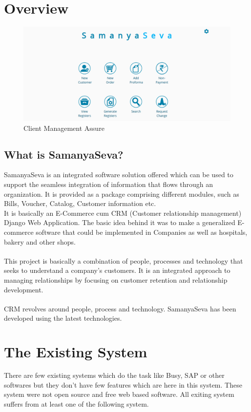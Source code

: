 \section{Overview}
\begin{figure}[!ht]
\centering
\includegraphics[scale=0.41]{input/images/samanya1.png}                   
\caption{Client Management Assure}
\hspace{-1.5em}
\end{figure}
\subsection{What is SamanyaSeva?}
 SamanyaSeva is an integrated software solution offered which can be used to support the seamless integration of information that flows through an organization. It is provided as a package comprising different modules, such as
Bills, Voucher, Catalog, Customer information etc.\\
It is basically an E-Commerce cum CRM (Customer relationship management) Django Web Application.
The basic idea behind it was to make a generalized E-commerce software that could be implemented in Companies as well as hospitals, bakery and other shops.\\\\
This project is basically a combination of people, processes and technology that seeks to understand a company's customers. It is an integrated approach to managing relationships by focusing on customer retention and relationship development.\\\\
CRM revolves around people, process and technology. SamanyaSeva has been developed using the latest technologies. 


\section{The Existing System}
There are few existing systems which do the task like Busy, SAP or other softwares but
they don't have few features which are here in this system. These system were not open source
and free web based software.
All exiting system suffers from at least one of the following system.
